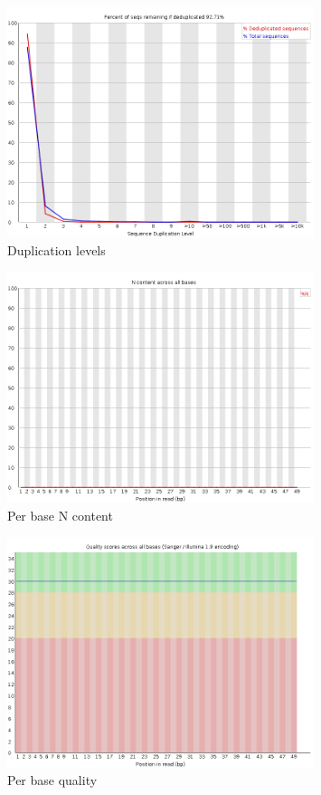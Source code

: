 \documentclass[UTF8]{ctexart}
\begin{document}
\begin{figure}[!htb]
	\centering
	\includegraphics[width=0.8\textwidth]{img/SRR14325859_FastQC_Origin_img/duplication_levels.png}	
	\caption{Duplication levels\protect}    
\end{figure}

\begin{figure}[!htb]
	\centering
	\includegraphics[width=0.8\textwidth]{img/SRR14325859_FastQC_Origin_img/per_base_n_content.png}	
	\caption{Per base N content\protect}    
\end{figure}

\begin{figure}[!htb]
	\centering
	\includegraphics[width=0.8\textwidth]{img/SRR14325859_FastQC_Origin_img/per_base_quality.png}	
	\caption{Per base quality\protect}    
\end{figure}
\end{document}

